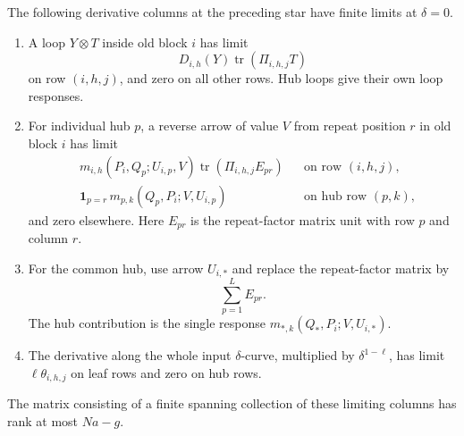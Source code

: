 \newpage
\begin{lemma}
\label{lem:limiting-columns}
The following derivative columns at the preceding star have finite
limits at \(\delta=0\).
\begin{enumerate}
\item A loop \(Y\otimes T\) inside old block \(i\) has limit
\[
 D_{i,h}(Y)\operatorname{tr}(\Pi_{i,h,j}T)
\]
on row \((i,h,j)\), and zero on all other rows. Hub loops give
their own loop responses.
\item For individual hub \(p\), a reverse arrow of value \(V\)
from repeat position \(r\) in old block \(i\) has limit
\begin{align*}
 &m_{i,h}(P_i,Q_p;U_{i,p},V)
      \operatorname{tr}(\Pi_{i,h,j}E_{pr})
       &&\text{on row }(i,h,j),\\
 &\mathbf 1_{p=r}\,
   m_{p,k}(Q_p,P_i;V,U_{i,p})
       &&\text{on hub row }(p,k),
\end{align*}
and zero elsewhere. Here \(E_{pr}\) is the repeat-factor matrix
unit with row \(p\) and column \(r\).
\item For the common hub, use arrow \(U_{i,*}\) and replace the
repeat-factor matrix by
\[
 \sum_{p=1}^L E_{pr}.
\]
The hub contribution is the single response
\(m_{*,k}(Q_*,P_i;V,U_{i,*})\).
\item The derivative along the whole input \(\delta\)-curve,
multiplied by \(\delta^{1-\ell}\), has limit
\(\ell\theta_{i,h,j}\) on leaf rows and zero on hub rows.
\end{enumerate}
The matrix consisting of a finite spanning collection of these
limiting columns has rank at most \(Na-g\).
\end{lemma}

